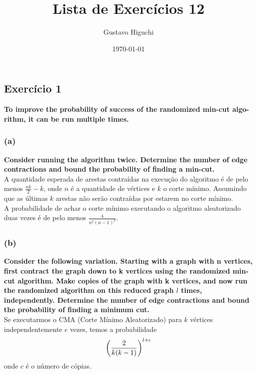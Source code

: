\documentclass{article}
\title{Lista de Exercícios 12}
\author{Gustavo Higuchi}
\date{\today}
\begin{document}
\maketitle

\tableofcontents
\newpage


\chapter{}
\section{Exercício 1}
\textbf{To improve the probability of success of the randomized min-cut algo-
rithm, it can be run multiple times.}
\subsection*{(a)} 
\textbf{Consider running the algorithm twice. Determine the number of edge contractions
and bound the probability of finding a min-cut.}\\

A quantidade esperada de arestas contraídas na execução do algoritmo é de pelo menos $\frac{nk}{2} - k$,
onde $n$ é a quantidade de vértices e $k$ o corte mínimo. Assumindo que as últimas $k$
arestas não serão contraídas por estarem no corte mínimo.\\

A probabilidade de achar o corte mínimo executando o algoritmo aleatorizado duas vezes 
é de pelo menos $\frac{4}{n^2(n-1)^2}$.


\subsection*{(b)} 
\textbf{Consider the following variation. Starting with a graph with n vertices, first 
contract the graph down to k vertices using the randomized min-cut algorithm. Make
copies of the graph with k vertices, and now run the randomized algorithm on this
reduced graph $l$ times, independently. Determine the number of edge contractions
and bound the probability of finding a minimum cut.}\\

Se executarmos o CMA (Corte Mínimo Aleatorizado) para $k$ vértices independentemente
$e$ vezes, temos a probabilidade\\

\begin{equation}
\notag
    \left(\frac{2}{k(k-1)}\right)^{l+c}
\end{equation}
onde $c$ é o número de cópias.\\
\end{document}
